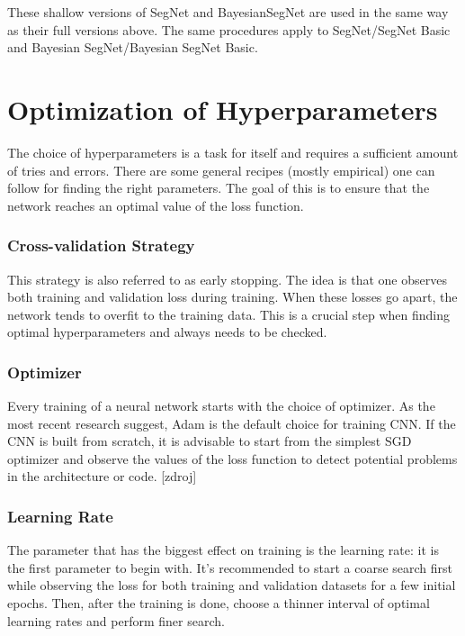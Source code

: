 These shallow versions of SegNet and BayesianSegNet are used in the same way as their full versions above. The same procedures apply to SegNet/SegNet Basic and Bayesian SegNet/Bayesian SegNet Basic.

\section{Optimization of Hyperparameters}

The choice of hyperparameters is a task for itself and requires a sufficient amount of tries and errors. There are some general recipes (mostly empirical) one can follow for finding the right parameters. The goal of this is to ensure that the network reaches an optimal value of the loss function.  

\subsubsection{Cross-validation Strategy}

This strategy is also referred to as early stopping. The idea is that one observes both training and validation loss during training. When these losses go apart, the network tends to overfit to the training data. This is a crucial step when finding optimal hyperparameters and always needs to be checked.

\subsubsection{Optimizer}

Every training of a neural network starts with the choice of optimizer. As the most recent research suggest, Adam is the default choice for training CNN. If the CNN is built from scratch, it is advisable to start from the simplest SGD optimizer and observe the values of the loss function to detect potential problems in the architecture or code. [zdroj] 

\subsubsection{Learning Rate}

The parameter that has the biggest effect on training is the learning rate: it is the first parameter to begin with. It's recommended to start a coarse search first while observing the loss for both training and validation datasets for a few initial epochs. Then, after the training is done, choose a thinner interval of optimal learning rates and perform finer search. 


